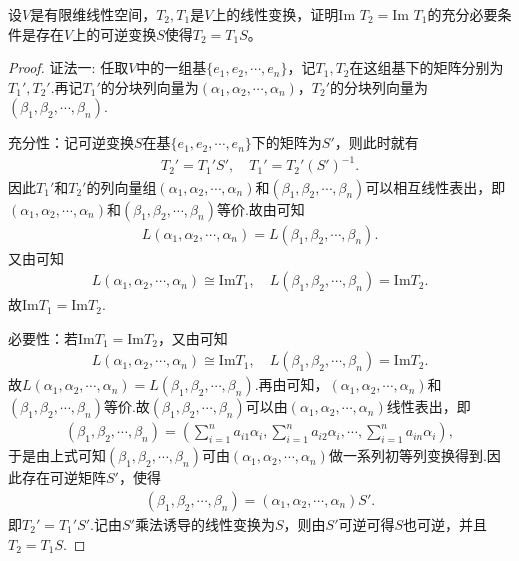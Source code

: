 \documentclass[../../main.tex]{subfiles}%
\begin{document}
\begin{proposition}\label{proposition:两个线性变换的值域相等的充要条件}
设\(V\)是有限维线性空间，\(T_2,T_1\)是\(V\)上的线性变换，证明\(\text{Im }T_2 = \text{Im }T_1\)的充分必要条件是存在\(V\)上的可逆变换\(S\)使得\(T_2 = T_1S\)。 
\end{proposition}
\begin{proof}

{\color{blue}证法一:}
任取$V$中的一组基$\{ e_1,e_2,\cdots ,e_n \}$，记$T_1,T_2$在这组基下的矩阵分别为$T_{1}',T_{2}'$.再记$T_{1}'$的分块列向量为$(\alpha _1,\alpha _2,\cdots ,\alpha _n)$，$T_{2}'$的分块列向量为$(\beta _1,\beta _2,\cdots ,\beta _n)$.

充分性：记可逆变换$S$在基$\{ e_1,e_2,\cdots ,e_n \}$下的矩阵为$S'$，则此时就有
\begin{align*}
T_{2}'=T_{1}'S',\quad T_{1}'=T_{2}'(S')^{-1}.
\end{align*}
因此$T_{1}'$和$T_{2}'$的列向量组$(\alpha _1,\alpha _2,\cdots ,\alpha _n)$和$(\beta _1,\beta _2,\cdots ,\beta _n)$可以相互线性表出，即$(\alpha _1,\alpha _2,\cdots ,\alpha _n)$和$(\beta _1,\beta _2,\cdots ,\beta _n)$等价.故由可知
\begin{align*}
L(\alpha _1,\alpha _2,\cdots ,\alpha _n) =L(\beta _1,\beta _2,\cdots ,\beta _n).
\end{align*}
又由可知
\begin{align*}
L(\alpha _1,\alpha _2,\cdots ,\alpha _n) \cong \mathrm{Im}T_1,\quad L(\beta _1,\beta _2,\cdots ,\beta _n) =\mathrm{Im}T_2.
\end{align*}
故$\mathrm{Im}T_1=\mathrm{Im}T_2$.

必要性：若$\mathrm{Im}T_1=\mathrm{Im}T_2$，又由可知
\begin{align*}
L(\alpha _1,\alpha _2,\cdots ,\alpha _n) \cong \mathrm{Im}T_1,\quad L(\beta _1,\beta _2,\cdots ,\beta _n) =\mathrm{Im}T_2.
\end{align*}
故$L(\alpha _1,\alpha _2,\cdots ,\alpha _n) =L(\beta _1,\beta _2,\cdots ,\beta _n)$.再由可知，$(\alpha _1,\alpha _2,\cdots ,\alpha _n)$和$(\beta _1,\beta _2,\cdots ,\beta _n)$等价.故$(\beta _1,\beta _2,\cdots ,\beta _n)$可以由$(\alpha _1,\alpha _2,\cdots ,\alpha _n)$线性表出，即
\begin{align*}
(\beta _1,\beta _2,\cdots ,\beta _n) = \left( \sum_{i=1}^n{a_{i1}\alpha _i},\sum_{i=1}^n{a_{i2}\alpha _i},\cdots ,\sum_{i=1}^n{a_{in}\alpha _i} \right),
\end{align*}
于是由上式可知$(\beta _1,\beta _2,\cdots ,\beta _n)$可由$(\alpha _1,\alpha _2,\cdots ,\alpha _n)$做一系列初等列变换得到.因此存在可逆矩阵$S'$，使得
\begin{align*}
(\beta _1,\beta _2,\cdots ,\beta _n) = (\alpha _1,\alpha _2,\cdots ,\alpha _n)S'.
\end{align*}
即$T_{2}'=T_{1}'S'$.记由$S'$乘法诱导的线性变换为$S$，则由$S'$可逆可得$S$也可逆，并且$T_2=T_1S$.


\end{proof}
\end{document}

